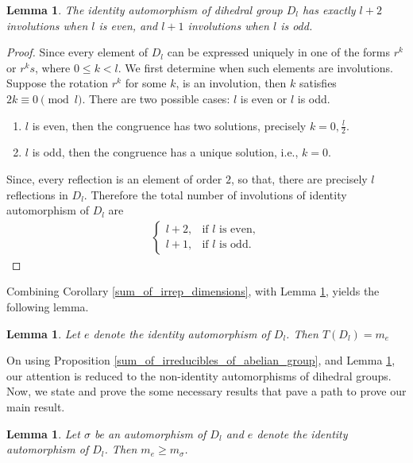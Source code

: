 \documentclass{amsart}
\newtheorem{lemma}[theorem]{Lemma}
\theoremstyle{definition}
\theoremstyle{remark}
\numberwithin{equation}{section}
\begin{document}
         \begin{lemma}\label{identity_involutions}
            The identity automorphism of dihedral group $D_l$ has exactly $l + 2$ involutions when $l$ is even, and $l + 1$ involutions when $l$ is odd.
        \end{lemma}
        \begin{proof}
            Since every element of $D_l$ can be expressed uniquely in one of the forms $r^k$ or $r^ks$, where $0 \le k < l$. We first determine when such elements are involutions. Suppose the rotation $r^k$ for some $k$, is an involution, then $k$ satisfies $2k \equiv 0 \pmod{l}$. There are two possible cases: $l$ is even or $l$ is odd.
            
            \begin{enumerate}
                \item[Case (i):]  $l$ is even, then the congruence has two solutions, precisely $k = 0, \frac{l}{2}$.
                \item[Case (ii):] $ l$ is odd, then the congruence has a unique solution, i.e., $k = 0$.
            \end{enumerate}
            Since, every reflection is an element of order $2$, so that, there are precisely $l$ reflections in $D_l$. Therefore the total number of involutions of identity automorphism of $D_l$ are
            \begin{align*}
                \begin{cases}
                    l + 2, & \text{if $l$ is even},\\[4pt]
                    l + 1, & \text{if $l$ is odd}.
                \end{cases}
            \end{align*}
        \end{proof}
        Combining Corollary \ref{sum_of_irrep_dimensions}, with Lemma \ref{identity_involutions}, yields the following lemma.
        \begin{lemma}\label{sum_of_irrep_equal_to_identity_in_Dn}
            Let $e$ denote the identity automorphism of $D_l$. Then $T(D_l) = m_e$
        \end{lemma}
        On using Proposition \ref{sum_of_irreducibles_of_abelian_group}, and Lemma \ref{sum_of_irrep_equal_to_identity_in_Dn}, our attention is reduced to the non-identity automorphisms of dihedral groups. Now, we state and prove the some necessary results that pave a path to prove our main result.
       \begin{lemma}\label{identity_greater_other}
            Let $\sigma$ be an automorphism of $D_l$ and $e$ denote the identity automorphism of $D_l$. Then $m_e \geq m_{\sigma}$.
        \end{lemma}
\end{document}
